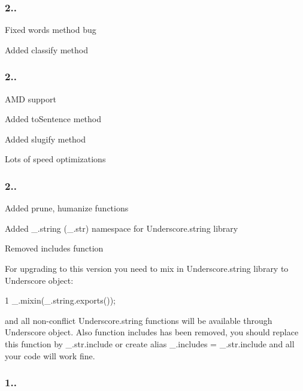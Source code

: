 \subsubsection*{2..}


\begin{DoxyItemize}
\item Fixed words method bug
\item Added classify method
\end{DoxyItemize}

\subsubsection*{2..}


\begin{DoxyItemize}
\item A\+M\+D support
\item Added to\+Sentence method
\item Added slugify method
\item Lots of speed optimizations
\end{DoxyItemize}

\subsubsection*{2..}


\begin{DoxyItemize}
\item Added prune, humanize functions
\item Added \+\_\+.\+string (\+\_\+.\+str) namespace for Underscore.\+string library
\item Removed includes function
\end{DoxyItemize}

For upgrading to this version you need to mix in Underscore.\+string library to Underscore object\+:


\begin{DoxyCode}
1 \_.mixin(\_.string.exports());
\end{DoxyCode}


and all non-\/conflict Underscore.\+string functions will be available through Underscore object. Also function {\ttfamily includes} has been removed, you should replace this function by {\ttfamily \+\_\+.\+str.\+include} or create alias {\ttfamily \+\_\+.\+includes = \+\_\+.\+str.\+include} and all your code will work fine.

\subsubsection*{1..}


